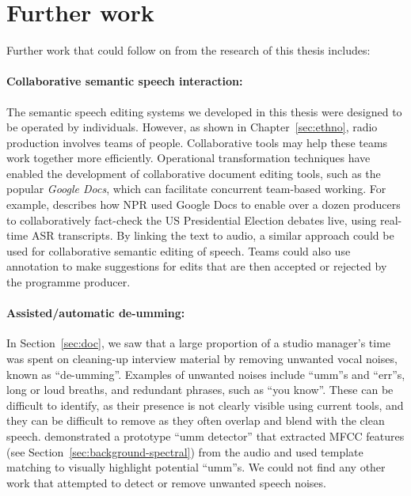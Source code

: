 \section{Further work}\label{sec:conclusions-further}

Further work that could follow on from the research of this thesis includes:

\paragraph{Collaborative semantic speech interaction:}

The semantic speech editing systems we developed in this thesis were designed to be operated by individuals.
However, as shown in Chapter~\ref{sec:ethno}, radio production involves teams of people.  Collaborative tools may help
these teams work together more efficiently.  Operational transformation techniques \citep{Sun2004} have enabled the
development of collaborative document editing tools, such as the popular \textit{Google Docs}, which can facilitate
concurrent team-based working.  For example, \citet{Fisher2016} describes how NPR used Google Docs to enable over a
dozen producers to collaboratively fact-check the US Presidential Election debates live, using real-time ASR
transcripts. By linking the text to audio, a similar approach could be used for collaborative semantic editing of
speech. Teams could also use annotation to make suggestions for edits that are then accepted or rejected by the
programme producer.

\paragraph{Assisted/automatic de-umming:}

In Section~\ref{sec:doc}, we saw that a large proportion of a studio manager's time was spent on cleaning-up interview
material by removing unwanted vocal noises, known as ``de-umming''. Examples of unwanted noises include ``umm''s and
``err''s, long or loud breaths, and redundant phrases, such as ``you know''.  These can be difficult to identify, as
their presence is not clearly visible using current tools, and they can be difficult to remove as they often overlap
and blend with the clean speech. \citet{Loviscach2013} demonstrated a prototype ``umm detector'' that extracted MFCC
features (see Section~\ref{sec:background-spectral}) from the audio and used template matching to visually highlight
potential ``umm''s. We could not find any other work that attempted to detect or remove unwanted speech noises.

